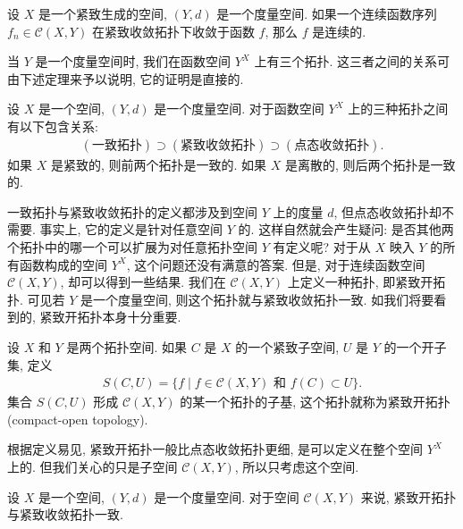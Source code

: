 \documentclass[../../main.tex]{subfiles}
\begin{document}
\begin{corollary}\label{corollary:ch07-limit-continuous}
设 $X$ 是一个紧致生成的空间, $(Y,d)$ 是一个度量空间. 如果一个连续函数序列 $f_n\in\mathcal{C}(X,Y)$ 在紧致收敛拓扑下收敛于函数 $f$, 那么 $f$ 是连续的.
\end{corollary}

当 $Y$ 是一个度量空间时, 我们在函数空间 $Y^X$ 上有三个拓扑. 这三者之间的关系可由下述定理来予以说明, 它的证明是直接的.

\begin{theorem}\label{theorem:ch07-topology-inclusion}
设 $X$ 是一个空间, $(Y,d)$ 是一个度量空间. 对于函数空间 $Y^X$ 上的三种拓扑之间有以下包含关系:
\begin{align*}
(\text{一致拓扑})\supset(\text{紧致收敛拓扑})\supset(\text{点态收敛拓扑}).
\end{align*}
如果 $X$ 是紧致的, 则前两个拓扑是一致的. 如果 $X$ 是离散的, 则后两个拓扑是一致的.
\end{theorem}

一致拓扑与紧致收敛拓扑的定义都涉及到空间 $Y$ 上的度量 $d$, 但点态收敛拓扑却不需要. 事实上, 它的定义是针对任意空间 $Y$ 的. 这样自然就会产生疑问: 是否其他两个拓扑中的哪一个可以扩展为对任意拓扑空间 $Y$ 有定义呢? 对于从 $X$ 映入 $Y$ 的所有函数构成的空间 $Y^X$, 这个问题还没有满意的答案. 但是, 对于连续函数空间 $\mathcal{C}(X,Y)$, 却可以得到一些结果. 我们在 $\mathcal{C}(X,Y)$ 上定义一种拓扑, 即紧致开拓扑. 可见若 $Y$ 是一个度量空间, 则这个拓扑就与紧致收敛拓扑一致. 如我们将要看到的, 紧致开拓扑本身十分重要.

\begin{definition}\label{definition:ch07-compact-open}
设 $X$ 和 $Y$ 是两个拓扑空间. 如果 $C$ 是 $X$ 的一个紧致子空间, $U$ 是 $Y$ 的一个开子集, 定义
\begin{align*}
S(C,U)=\{f\mid f\in\mathcal{C}(X,Y)\text{ 和 }f(C)\subset U\}.
\end{align*}
集合 $S(C,U)$ 形成 $\mathcal{C}(X,Y)$ 的某一个拓扑的子基, 这个拓扑就称为紧致开拓扑(compact-open topology).
\end{definition}

根据定义易见, 紧致开拓扑一般比点态收敛拓扑更细, 是可以定义在整个空间 $Y^X$ 上的. 但我们关心的只是子空间 $\mathcal{C}(X,Y)$, 所以只考虑这个空间.

\begin{theorem}\label{theorem:ch07-compact-open-equals-compact-convergence}
设 $X$ 是一个空间, $(Y,d)$ 是一个度量空间. 对于空间 $\mathcal{C}(X,Y)$ 来说, 紧致开拓扑与紧致收敛拓扑一致.
\end{theorem}
\end{document}
